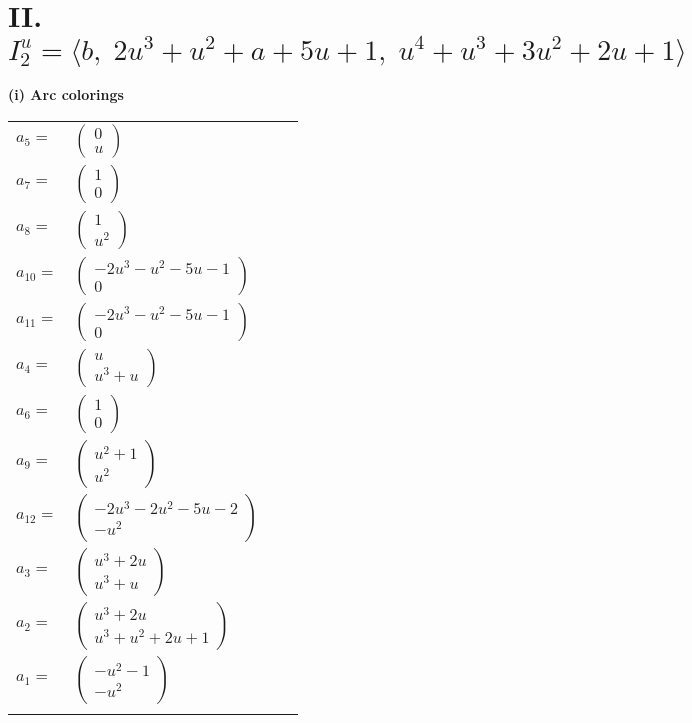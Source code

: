\documentclass[1p]{elsarticle_modified}
\theoremstyle{definition}
\begin{document}
\centering \section*{II. $I^u_{2}= \langle b,\;2 u^3+u^2+a+5 u+1,\;u^4+u^3+3 u^2+2 u+1 \rangle$}
\flushleft \textbf{(i) Arc colorings}\\
\begin{tabular}{m{7pt} m{180pt} m{7pt} m{180pt} }
\flushright $a_{5}=$&$\begin{pmatrix}0\\u\end{pmatrix}$ \\
\flushright $a_{7}=$&$\begin{pmatrix}1\\0\end{pmatrix}$ \\
\flushright $a_{8}=$&$\begin{pmatrix}1\\u^2\end{pmatrix}$ \\
\flushright $a_{10}=$&$\begin{pmatrix}-2 u^3- u^2-5 u-1\\0\end{pmatrix}$ \\
\flushright $a_{11}=$&$\begin{pmatrix}-2 u^3- u^2-5 u-1\\0\end{pmatrix}$ \\
\flushright $a_{4}=$&$\begin{pmatrix}u\\u^3+u\end{pmatrix}$ \\
\flushright $a_{6}=$&$\begin{pmatrix}1\\0\end{pmatrix}$ \\
\flushright $a_{9}=$&$\begin{pmatrix}u^2+1\\u^2\end{pmatrix}$ \\
\flushright $a_{12}=$&$\begin{pmatrix}-2 u^3-2 u^2-5 u-2\\- u^2\end{pmatrix}$ \\
\flushright $a_{3}=$&$\begin{pmatrix}u^3+2 u\\u^3+u\end{pmatrix}$ \\
\flushright $a_{2}=$&$\begin{pmatrix}u^3+2 u\\u^3+u^2+2 u+1\end{pmatrix}$ \\
\flushright $a_{1}=$&$\begin{pmatrix}- u^2-1\\- u^2\end{pmatrix}$\\&\end{tabular}
\end{document}
